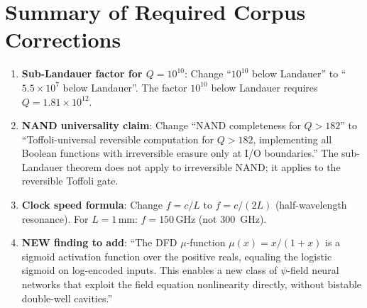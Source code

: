 \documentclass[11pt]{article}
\theoremstyle{definition}
\theoremstyle{remark}
\begin{document}
\section*{Summary of Required Corpus Corrections}

\begin{enumerate}
\item \textbf{Sub-Landauer factor for $Q = 10^{10}$}: Change
  ``$10^{10}$ below Landauer'' to ``$5.5\times 10^7$ below Landauer''.
  The factor $10^{10}$ below Landauer requires $Q = 1.81\times 10^{12}$.

\item \textbf{NAND universality claim}: Change ``NAND completeness for
  $Q > 182$'' to ``Toffoli-universal reversible computation for $Q > 182$,
  implementing all Boolean functions with irreversible erasure only
  at I/O boundaries.'' The sub-Landauer theorem does not apply to
  irreversible NAND; it applies to the reversible Toffoli gate.

\item \textbf{Clock speed formula}: Change $f = c/L$ to $f = c/(2L)$
  (half-wavelength resonance). For $L = 1\,\mathrm{mm}$: $f = 150\,\mathrm{GHz}$
  (not 300~GHz).

\item \textbf{NEW finding to add}: ``The DFD $\mu$-function
  $\mu(x) = x/(1+x)$ is a sigmoid activation function over the positive
  reals, equaling the logistic sigmoid on log-encoded inputs. This
  enables a new class of $\psi$-field neural networks that exploit
  the field equation nonlinearity directly, without bistable
  double-well cavities.''
\end{enumerate}
\end{document}
